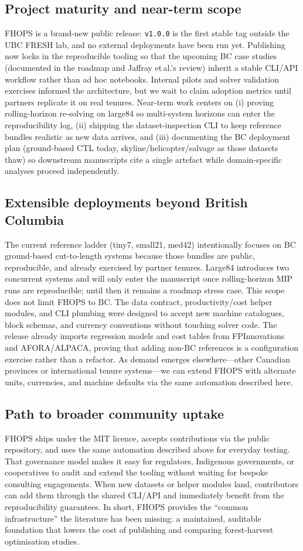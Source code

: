 \subsection{Project maturity and near-term scope}
FHOPS is a brand-new public release: \texttt{v1.0.0} is the first stable tag outside the UBC FRESH lab, and no external deployments have been run yet. Publishing now locks in the reproducible tooling so that the upcoming BC case studies (documented in the roadmap and Jaffray et\,al.’s review) inherit a stable CLI/API workflow rather than ad hoc notebooks. Internal pilots and solver validation exercises informed the architecture, but we wait to claim adoption metrics until partners replicate it on real tenures. Near-term work centers on (i) proving rolling-horizon re-solving on large84 so multi-system horizons can enter the reproducibility log, (ii) shipping the dataset-inspection CLI to keep reference bundles realistic as new data arrives, and (iii) documenting the BC deployment plan (ground-based CTL today, skyline/helicopter/salvage as those datasets thaw) so downstream manuscripts cite a single artefact while domain-specific analyses proceed independently.

\subsection{Extensible deployments beyond British Columbia}
The current reference ladder (tiny7, small21, med42) intentionally focuses on BC ground-based cut-to-length systems because those bundles are public, reproducible, and already exercised by partner tenures. Large84 introduces two concurrent systems and will only enter the manuscript once rolling-horizon MIP runs are reproducible; until then it remains a roadmap stress case. This scope does not limit FHOPS to BC. The data contract, productivity/cost helper modules, and CLI plumbing were designed to accept new machine catalogues, block schemas, and currency conventions without touching solver code. The release already imports regression models and cost tables from FPInnovations and AFORA/ALPACA, proving that adding non-BC references is a configuration exercise rather than a refactor. As demand emerges elsewhere—other Canadian provinces or international tenure systems—we can extend FHOPS with alternate units, currencies, and machine defaults via the same automation described here.

\subsection{Path to broader community uptake}
FHOPS ships under the MIT licence, accepts contributions via the public repository, and uses the same automation described above for everyday testing. That governance model makes it easy for regulators, Indigenous governments, or cooperatives to audit and extend the tooling without waiting for bespoke consulting engagements. When new datasets or helper modules land, contributors can add them through the shared CLI/API and immediately benefit from the reproducibility guarantees. In short, FHOPS provides the “common infrastructure” the literature has been missing: a maintained, auditable foundation that lowers the cost of publishing and comparing forest-harvest optimisation studies.

